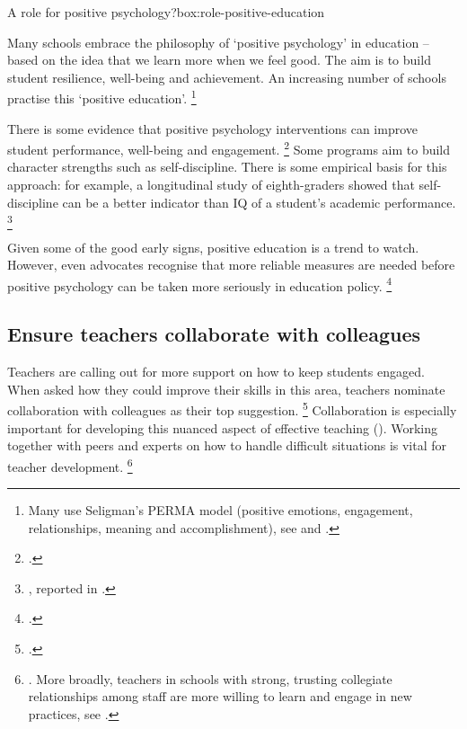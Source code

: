 \documentclass[FrontPage]{grattan}
\begin{document}
\begin{smallbox}{A role for positive psychology?}{box:role-positive-education}

Many schools embrace the philosophy of `positive psychology’ in education -- based on the idea that we learn more when we feel good. The aim is to build student resilience, well-being and achievement. An increasing number of schools practise this `positive education’.%
    \footnote{Many use Seligman’s PERMA model (positive emotions, engagement, relationships, meaning and accomplishment), see \textcite{Waters2011ReviewSchoolBased} and \textcite{Seligman2011FlourishVisionaryNew}.}

There is some evidence that positive psychology interventions can improve student performance, well-being and engagement.%
    \footcites{Durlak2011ImpactEnhancingStudents}{Waters2011ReviewSchoolBased} Some programs aim to build character strengths such as self-discipline. There is some empirical basis for this approach: for example, a longitudinal study of eighth-graders showed that self-discipline can be a better indicator than IQ of a student’s academic performance.%
    \footnote{\textcite{DuckSeligman2005SelfDisciolineOutdoes}, reported in \textcite{Waters2011ReviewSchoolBased}.}
 

Given some of the good early signs, positive education is a trend to watch. However, even advocates recognise that more reliable measures are needed before positive psychology can be taken more seriously in education policy.%
    \footcite{White2016WhyWontItStick}
\end{smallbox}

\CenturyFootnote

\subsection{Ensure teachers collaborate with colleagues}\label{subsubsec:ensure-teachers-collaborate}
Teachers are calling out for more support on how to keep students engaged. When asked how they could improve their skills in this area, teachers nominate collaboration with colleagues as their top suggestion.%
    \footcite{Sullivan2014PunishThemEngage}
Collaboration is especially important for developing this nuanced aspect of effective teaching (). Working together with peers and experts on how to handle difficult situations is vital for teacher development.%
    \footnote{\textcites{Epstein2008ReducingBehaviorProblems}{Hough2011CharacteristicsEffectiveProfessional}. More broadly, teachers in schools with strong, trusting collegiate relationships among staff are more willing to learn and engage in new practices, see \textcite{Epstein2008ReducingBehaviorProblems}.}
\end{document}
